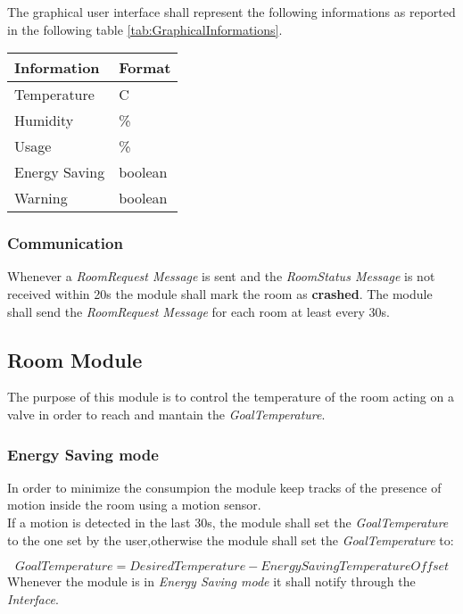 The graphical user interface shall represent the following informations as reported in the following table \ref{tab:GraphicalInformations}.
\begin{table}[H]
	\centering
			\begin{tabular}{||l | l||} 
			\hline
			\textbf{Information}	& \textbf{Format} \\ 
			\hline
			Temperature	& C\degree \\ 
			\hline
			Humidity	& \% \\ 
			\hline
			Usage		& \% \\ 
			\hline
			Energy Saving	& boolean \\ 
			\hline
			Warning		& boolean \\ 
			\hline
		\end{tabular}
\end{table}

\subsubsection{Communication}
Whenever a \textit{RoomRequest Message} is sent and the \textit{RoomStatus Message} is not received within 20s the module shall mark the room as \textbf{crashed}.
The module shall send the \textit{RoomRequest Message} for each room at least every 30s.

\subsection{Room Module}
The purpose of this module is to control the temperature of the room acting on a valve in order to 
reach and mantain the \textit{GoalTemperature}.

\subsubsection{Energy Saving mode}
In order to minimize the consumpion the module keep tracks of the presence of motion inside the room
using a motion sensor. \\

If a motion is detected in the last 30s, the module shall set the \textit{GoalTemperature} to the one set by the user,otherwise the module shall set the \textit{GoalTemperature} to:

\begin{equation}
	GoalTemperature = DesiredTemperature - EnergySavingTemperatureOffset
\end{equation}
Whenever the module is in \textit{Energy Saving mode} it shall notify through the \textit{Interface}.

